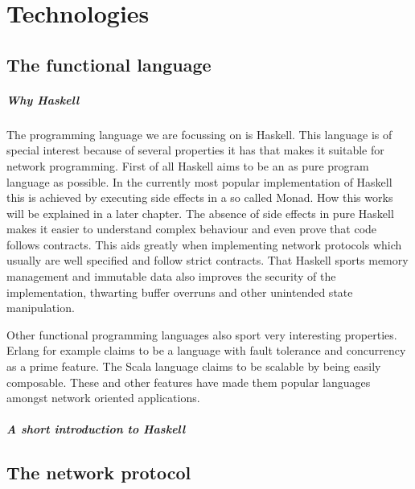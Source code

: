\chapter{Technologies}
\section{The functional language}
\paragraph{Why Haskell}
The programming language we are focussing on is Haskell.
This language is of special interest because of several properties it has that makes it suitable for network programming.
First of all Haskell aims to be an as pure program language as possible.
In the currently most popular implementation of Haskell this is achieved by executing side effects in a so called Monad.
How this works will be explained in a later chapter.
The absence of side effects in pure Haskell makes it easier to understand complex behaviour and even prove that code follows contracts.
This aids greatly when implementing network protocols which usually are well specified and follow strict contracts.
That Haskell sports memory management and immutable data also improves the security of the implementation, thwarting buffer overruns and other unintended state manipulation.

Other functional programming languages also sport very interesting properties.
Erlang for example claims to be a language with fault tolerance and concurrency as a prime feature\cite{armstrong_concurrent_1993}.
The Scala language claims to be scalable by being easily composable\cite{odersky_overview_????}.
These and other features have made them popular languages amongst network oriented applications. %
\paragraph{A short introduction to Haskell}
\section{The network protocol}
